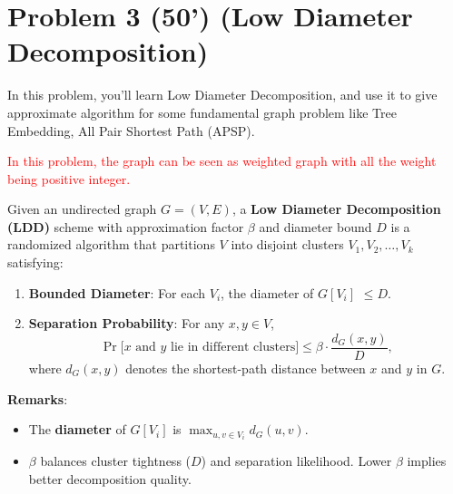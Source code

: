 \section*{Problem 3 (50') (Low Diameter Decomposition)} 
In this problem, you'll learn Low Diameter Decomposition, and use it to give approximate algorithm for some fundamental graph problem like Tree Embedding, All Pair Shortest Path (APSP).

\textcolor{red}{In this problem, the graph can be seen as weighted graph with all the weight being positive integer. }
\begin{definition}
    Given an undirected graph $G = (V, E)$, a \textbf{Low Diameter Decomposition (LDD)} scheme with approximation factor $\beta$ and diameter bound $D$ is a randomized algorithm that partitions $V$ into disjoint clusters $V_1, V_2, \dots, V_k$ satisfying:
    \begin{enumerate}
        \item \textbf{Bounded Diameter}: For each $V_i$, the diameter of $G[V_i]$  $\leq D$.
        \item \textbf{Separation Probability}: For any $x, y \in V$,
        $$
            \Pr\big[\text{$x$ and $y$ lie in different clusters}\big] \leq \beta \cdot \frac{d_G(x, y)}{D},
        $$
        where $d_G(x, y)$ denotes the shortest-path distance between $x$ and $y$ in $G$.
    \end{enumerate}
\end{definition}

\noindent \textbf{Remarks}:
\begin{itemize}
    \item The \textbf{diameter} of $G[V_i]$ is $\max_{u,v \in V_i} d_{G}(u, v)$.
    \item $\beta$ balances cluster tightness ($D$) and separation likelihood. Lower $\beta$ implies better decomposition quality.
\end{itemize}

